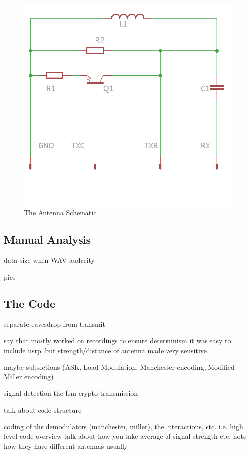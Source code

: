 \documentclass[fleqn,10pt]{SelfArx} %
\begin{document}
\begin{figure}[h]
  \includegraphics[width=\linewidth]{img/antennaschematic}
  \caption{The Antenna Schematic}
  \label{fig:antennaschematic}
\end{figure}


\subsection{Manual Analysis}
data size when WAV
audacity

pics 


\subsection{The Code}
separate eavesdrop from transmit

say that mostly worked on recordings to ensure determinism
it was easy to include usrp, but strength/distance of antenna made very sensitive

maybe subsections
(ASK, Load Modulation, Manchester encoding, Modified Miller encoding)

	signal detection 
	the fsm	
	crypto
	transmission

talk about code structure



coding of the demodulators (manchester, miller), the interactions, etc. i.e. high level code overview
talk about how you take average of signal strength etc. note how they have different antennas usually
\end{document}
